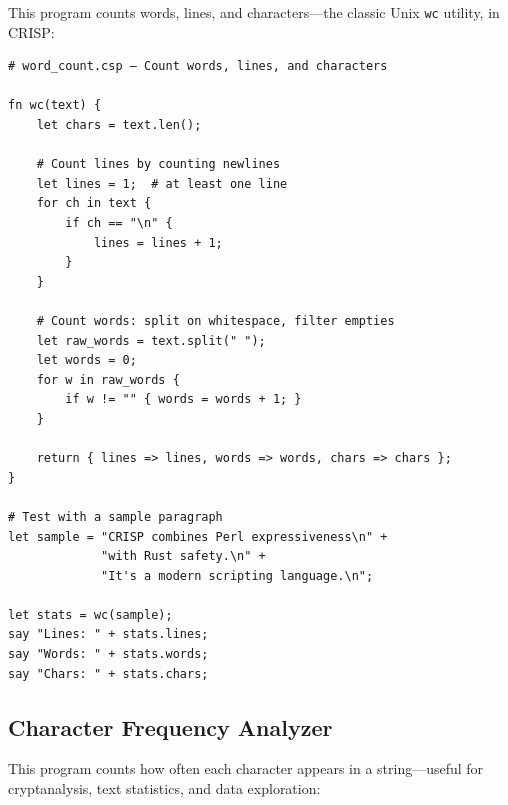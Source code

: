 This program counts words, lines, and characters—the classic Unix \texttt{wc} utility, in CRISP:

\begin{tcolorbox}[colback=codebg, colframe=darkpurple, colbacktitle=darkpurple, title=\textbf{\textcolor{codegold}{Word Counter (word\_count.csp)}}, fonttitle=\bfseries, sharp corners]
\begin{lstlisting}
# word_count.csp — Count words, lines, and characters

fn wc(text) {
    let chars = text.len();

    # Count lines by counting newlines
    let lines = 1;  # at least one line
    for ch in text {
        if ch == "\n" {
            lines = lines + 1;
        }
    }

    # Count words: split on whitespace, filter empties
    let raw_words = text.split(" ");
    let words = 0;
    for w in raw_words {
        if w != "" { words = words + 1; }
    }

    return { lines => lines, words => words, chars => chars };
}

# Test with a sample paragraph
let sample = "CRISP combines Perl expressiveness\n" +
             "with Rust safety.\n" +
             "It's a modern scripting language.\n";

let stats = wc(sample);
say "Lines: " + stats.lines;
say "Words: " + stats.words;
say "Chars: " + stats.chars;
\end{lstlisting}
\end{tcolorbox}

\subsection{Character Frequency Analyzer}

This program counts how often each character appears in a string—useful for cryptanalysis, text statistics, and data exploration:

